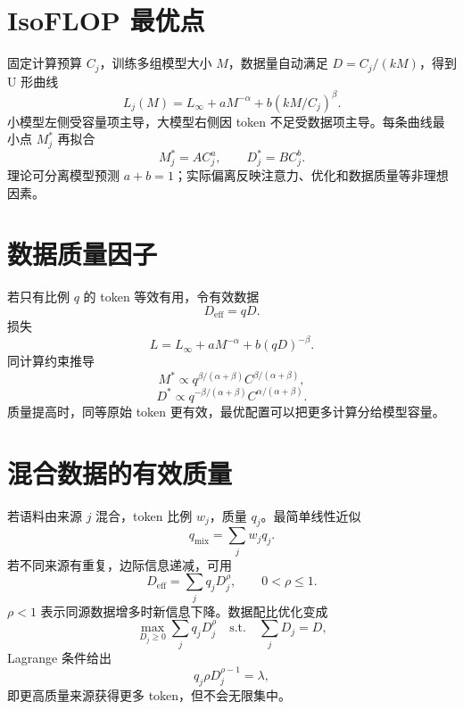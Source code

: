 \documentclass[UTF8,12pt,a4paper,fontset=none]{ctexart}
\numberwithin{equation}{section}
\begin{document}
\section{IsoFLOP 最优点}
固定计算预算 $C_j$，训练多组模型大小 $M$，数据量自动满足 $D=C_j/(kM)$，得到 U 形曲线
\begin{equation}
 L_j(M)=L_\infty+aM^{-\alpha}+b(kM/C_j)^\beta.
\end{equation}
小模型左侧受容量项主导，大模型右侧因 token 不足受数据项主导。每条曲线最小点 $M_j^*$ 再拟合
\begin{equation}
 M_j^*=A C_j^a,
 \qquad D_j^*=B C_j^b.
\end{equation}
理论可分离模型预测 $a+b=1$；实际偏离反映注意力、优化和数据质量等非理想因素。

\section{数据质量因子}
若只有比例 $q$ 的 token 等效有用，令有效数据
\begin{equation}
 D_{\mathrm{eff}}=qD.
\end{equation}
损失
\begin{equation}
 L=L_\infty+aM^{-\alpha}+b(qD)^{-\beta}.
\end{equation}
同计算约束推导
\begin{equation}
 M^*\propto q^{\beta/(\alpha+\beta)}C^{\beta/(\alpha+\beta)},
\end{equation}
\begin{equation}
 D^*\propto q^{-\beta/(\alpha+\beta)}C^{\alpha/(\alpha+\beta)}.
\end{equation}
质量提高时，同等原始 token 更有效，最优配置可以把更多计算分给模型容量。

\section{混合数据的有效质量}
若语料由来源 $j$ 混合，token 比例 $w_j$，质量 $q_j$。最简单线性近似
\begin{equation}
 q_{\mathrm{mix}}=\sum_jw_jq_j.
\end{equation}
若不同来源有重复，边际信息递减，可用
\begin{equation}
 D_{\mathrm{eff}}=\sum_jq_jD_j^\rho,
 \qquad 0<\rho\le1.
\end{equation}
$\rho<1$ 表示同源数据增多时新信息下降。数据配比优化变成
\begin{equation}
 \max_{D_j\ge0}\sum_jq_jD_j^\rho
 \quad\text{s.t.}\quad\sum_jD_j=D,
\end{equation}
Lagrange 条件给出
\begin{equation}
 q_j\rho D_j^{\rho-1}=\lambda,
\end{equation}
即更高质量来源获得更多 token，但不会无限集中。
\end{document}
